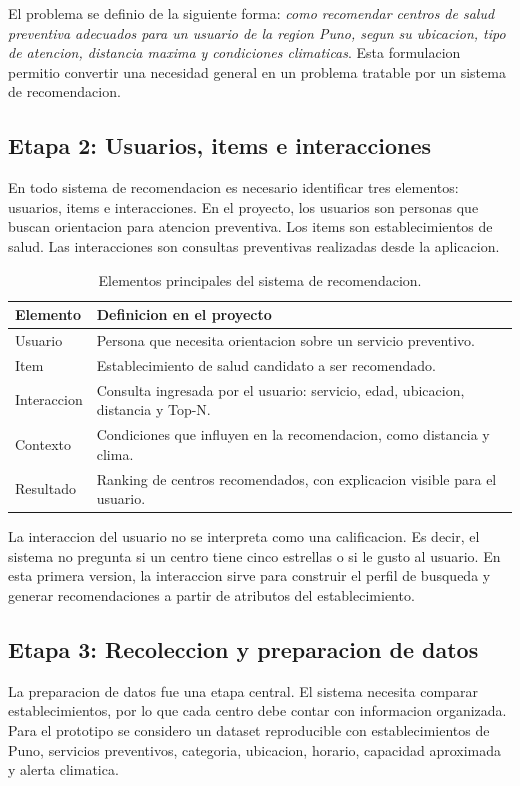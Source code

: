 \documentclass[12pt,a4paper]{article}
\begin{document}
El problema se definio de la siguiente forma: \textit{como recomendar centros de salud preventiva adecuados para un usuario de la region Puno, segun su ubicacion, tipo de atencion, distancia maxima y condiciones climaticas}. Esta formulacion permitio convertir una necesidad general en un problema tratable por un sistema de recomendacion.

\subsection{Etapa 2: Usuarios, items e interacciones}
En todo sistema de recomendacion es necesario identificar tres elementos: usuarios, items e interacciones. En el proyecto, los usuarios son personas que buscan orientacion para atencion preventiva. Los items son establecimientos de salud. Las interacciones son consultas preventivas realizadas desde la aplicacion.

\begin{table}[H]
\centering
\caption{Elementos principales del sistema de recomendacion.}
\label{tab:elementos}
\begin{tabular}{p{3.5cm}p{9cm}}
\toprule
Elemento & Definicion en el proyecto \\
\midrule
Usuario & Persona que necesita orientacion sobre un servicio preventivo. \\
Item & Establecimiento de salud candidato a ser recomendado. \\
Interaccion & Consulta ingresada por el usuario: servicio, edad, ubicacion, distancia y Top-N. \\
Contexto & Condiciones que influyen en la recomendacion, como distancia y clima. \\
Resultado & Ranking de centros recomendados, con explicacion visible para el usuario. \\
\bottomrule
\end{tabular}
\end{table}

La interaccion del usuario no se interpreta como una calificacion. Es decir, el sistema no pregunta si un centro tiene cinco estrellas o si le gusto al usuario. En esta primera version, la interaccion sirve para construir el perfil de busqueda y generar recomendaciones a partir de atributos del establecimiento.

\subsection{Etapa 3: Recoleccion y preparacion de datos}
La preparacion de datos fue una etapa central. El sistema necesita comparar establecimientos, por lo que cada centro debe contar con informacion organizada. Para el prototipo se considero un dataset reproducible con establecimientos de Puno, servicios preventivos, categoria, ubicacion, horario, capacidad aproximada y alerta climatica.
\end{document}

